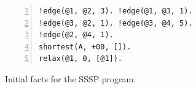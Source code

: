\begin{figure}[ht]
\begin{Verbatim}[numbers=left,fontsize=\codesize,commandchars=\*\#\&]
!edge(@1, @2, 3). !edge(@1, @3, 1).
!edge(@3, @2, 1). !edge(@3, @4, 5).
!edge(@2, @4, 1).
shortest(A, +00, []).
relax(@1, 0, [@1]).
\end{Verbatim}
\caption{Initial facts for the SSSP program.}
\label{code:coord:sssp_init}
\end{figure}

